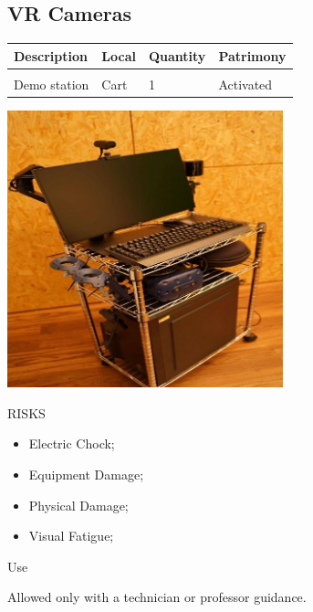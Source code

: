 \subsection{VR Cameras}
\begin{tabularx}{\textwidth}{ Y  Y  Y  Y }
    \textbf{Description} &  \textbf{Local} &  \textbf{Quantity} & \textbf{Patrimony}\\
    \hline \\
     Demo station & Cart & 1 & Activated
\end{tabularx}
\vspace{1cm}

\begin{multicols}{2}

\includegraphics[width=80mm, keepaspectratio]{imgs/image3.jpg}

\columnbreak

\begin{mdframed}[roundcorner=10pt, linecolor=red, linewidth=2pt]
\vspace{1em}
{\Large {\color{red}RISKS}}
\vspace{1em}

\begin{itemize}
    \item Electric Chock;
    \item Equipment Damage;
    \item Physical Damage;
    \item Visual Fatigue; 
\end{itemize}

\vspace{1em}
\end{mdframed}

\vspace{2em}

{\Large Use}
\vspace{1em}

Allowed only with a technician or professor guidance.
\end{multicols}

